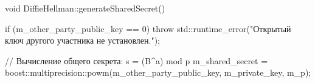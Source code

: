 \begin{nvimstyle}
void DiffieHellman::generateSharedSecret()
{
	if (m_other_party_public_key == 0)
	{
		throw std::runtime_error("Открытый ключ другого участника не установлен.");
	}

	// Вычисление общего секрета: s = (B^a) mod p
	m_shared_secret = boost::multiprecision::powm(m_other_party_public_key, m_private_key, m_p);
}
\end{nvimstyle}
